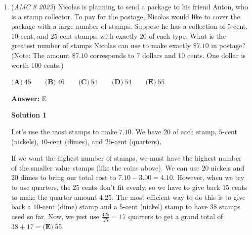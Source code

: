 \begin{enumerate}
 We are given that $\frac{3d}{8}=\frac{d}{3}+2,$ from which  
 \begin{align*} \frac{9d}{24}&=\frac{8d}{24}+2 \\ \frac{d}{24}&=2 \\ d&=\boxed{\textbf{(D)}\ 48}. \end{align*}
~apex304, SohumUttamchandani, wuwang2002, TaeKim, Cxrupptedpat, MRENTHUSIASM

 



\textbf{Solution 2 (Arithmetic)}

Since there are $7$ water stations, they divide the race into $8$ parts. The $2$ repair stations divide the race into $3$ parts. The $3$rd water station would be located at $\dfrac{3}{8}$ of the race, and the $1$st repair station would be located at $\dfrac{1}{3}$ of the race. Taking $\dfrac{3}{8} - \dfrac{1}{3}$ to find the fraction of the race between them gives us $\dfrac{1}{24}$. There are $2$ miles between them, so $2$ miles is $\dfrac{1}{24}$ of the race. Multiplying both by $24$ gives us $\boxed{\textbf{(D)}\ 48}$ miles for the whole race.

 


	\item (\textit{AMC 8 2023}) Nicolas is planning to send a package to his friend Anton, who is a stamp collector. To pay for the postage, Nicolas would like to cover the package with a large number of stamps. Suppose he has a collection of $5$-cent, $10$-cent, and $25$-cent stamps, with exactly $20$ of each type. What is the greatest number of stamps Nicolas can use to make exactly $\$7.10$ in postage?
(Note: The amount $\$7.10$ corresponds to $7$ dollars and $10$ cents. One dollar is worth $100$ cents.)


 $\textbf{(A)}\ 45 \qquad \textbf{(B)}\ 46 \qquad \textbf{(C)}\ 51 \qquad \textbf{(D)}\ 54\qquad \textbf{(E)}\ 55$

 \textbf{Answer: }E



\textbf{Solution 1}

Let's use the most stamps to make $7.10.$ We have $20$ of each stamp, $5$-cent (nickels), $10$-cent (dimes), and $25$-cent (quarters).

 If we want the highest number of stamps, we must have the highest number of the smaller value stamps (like the coins above). We can use $20$ nickels and $20$ dimes to bring our total cost to $7.10 - 3.00 = 4.10$. However, when we try to use quarters, the $25$ cents don’t fit evenly, so we have to give back $15$ cents to make the quarter amount $4.25$. The most efficient way to do this is to give back a  $10$-cent (dime) stamp and a $5$-cent (nickel) stamp to have $38$ stamps used so far. Now, we just use $\frac{425}{25} = 17$ quarters to get a grand total of $38 + 17 = \boxed{\textbf{(E)}\ 55}$.


\end{enumerate}
